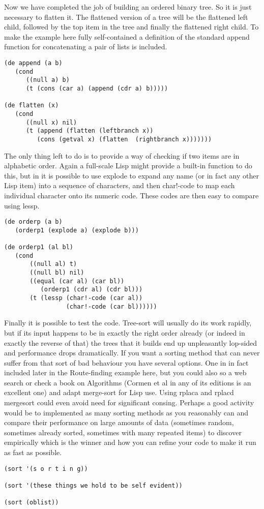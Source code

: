 Now we have completed the job of building an ordered binary tree. So it is
just necessary to flatten it. The flattened version of a tree will be
the flattened left child, followed by the top item in the tree and
finally the flattened right child. To make the example here fully
self-contained a definition of the standard {\tx append} function for
concatenating a pair of lists is included.
{\small\begin{verbatim}
(de append (a b)
   (cond
      ((null a) b)
      (t (cons (car a) (append (cdr a) b)))))

(de flatten (x)
   (cond
      ((null x) nil)
      (t (append (flatten (leftbranch x))
         (cons (getval x) (flatten  (rightbranch x)))))))
\end{verbatim}}

The only thing left to do is to provide a way of checking if two
items are in alphabetic order. Again a full-scale Lisp might provide a
built-in function to do this, but in \vsl{} it is possible to use
{\tx explode} to expand any name (or in fact any other Lisp item) into
a sequence of characters, and then {\tx char!-code} to map each
individual character onto its numeric code. These codes are then easy
to compare using {\tx lessp}. 
{\small\begin{verbatim}
(de orderp (a b)
   (orderp1 (explode a) (explode b)))

(de orderp1 (al bl)
   (cond
       ((null al) t)
       ((null bl) nil)
       ((equal (car al) (car bl)) 
          (orderp1 (cdr al) (cdr bl)))
       (t (lessp (char!-code (car al))
                 (char!-code (car bl))))))
\end{verbatim}}

Finally it is possible to test the code. Tree-sort will usually do its
work rapidly, but if its input happens to be in exactly the right order
already (or indeed in exactly the reverse of that) the trees that it
builds end up unpleasantly lop-sided and performance drops dramatically.
If you want a sorting method that can never suffer from that sort of
bad behaviour you have several options. One in in fact included later in the
Route-finding example here, but you could also so a web search or
check a book on Algorithms (Cormen et al\cite{cormen} in any
of its editions is an excellent one)
and adapt merge-sort for Lisp use. Using {\tx rplaca} and {\tx rplacd} mergesort
could even avoid need for significant {\tx cons}ing. Perhaps a good activity
would be to implemented as many sorting methods as you reasonably can and
compare their performance on large amounts of data (sometimes random, sometimes
already sorted, sometimes with many repeated items) to discover
empirically which is the winner and how you can refine your code to make it
run as fast as possible.
{\small\begin{verbatim}
(sort '(s o r t i n g))

(sort '(these things we hold to be self evident))

(sort (oblist))
\end{verbatim}}

